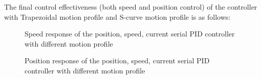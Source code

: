 \documentclass[11pt,a4paper]{article}%
\begin{document}
The final control effectiveness (both speed and position control) of the controller with Trapezoidal motion profile and S-curve motion profile is as follows:
\begin{figure}[H]
    \centering
    \caption{Speed response of the position, speed, current serial PID controller with different motion profile}
    \label{3}
\end{figure}
\begin{figure}[H]
    \centering
    \caption{Position response of the position, speed, current serial PID controller with different motion profile}
    \label{4}
\end{figure}
\end{document}
